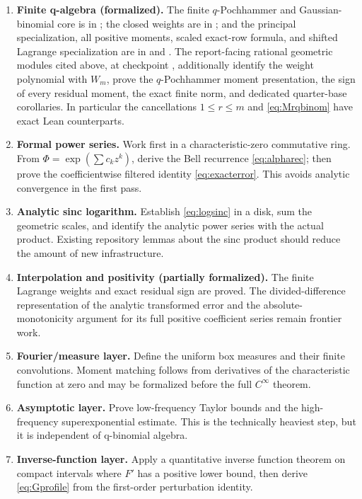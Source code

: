 \documentclass[11pt]{article}
\theoremstyle{definition}
\theoremstyle{remark}
\begin{document}
\begin{enumerate}[label=\arabic*.,leftmargin=9mm]
\item \textbf{Finite q-algebra (formalized).}  The finite \(q\)-Pochhammer
and Gaussian-binomial core is in ; the closed
weights are in ; and the principal
specialization, all positive moments, scaled exact-row formula, and shifted
Lagrange specialization are in  and
.  The report-facing rational geometric
modules cited above, at checkpoint
, additionally identify the
weight polynomial with \(W_m\), prove the \(q\)-Pochhammer moment presentation,
the sign of every residual moment, the exact finite norm, and dedicated
quarter-base corollaries.  In particular the
cancellations \(1\leq r\leq m\) and \eqref{eq:Mrqbinom} have exact Lean
counterparts.

\item \textbf{Formal power series.} Work first in a characteristic-zero
commutative ring. From \(\Phi=\exp(\sum c_kz^k)\), derive the Bell recurrence
\eqref{eq:alpharec}; then prove the coefficientwise filtered identity
\eqref{eq:exacterror}. This avoids analytic convergence in the first pass.

\item \textbf{Analytic sinc logarithm.} Establish \eqref{eq:logsinc} in a disk,
sum the geometric scales, and identify the analytic power series with the actual
product. Existing repository lemmas about the sinc product should reduce the
amount of new infrastructure.

\item \textbf{Interpolation and positivity (partially formalized).}  The
finite Lagrange weights and exact residual sign are proved.  The
divided-difference representation of the analytic transformed error and the
absolute-monotonicity argument for its full positive coefficient series remain
frontier work.

\item \textbf{Fourier/measure layer.} Define the uniform box measures and their
finite convolutions. Moment matching follows from derivatives of the
characteristic function at zero and may be formalized before the full
\(C^\infty\) theorem.

\item \textbf{Asymptotic layer.} Prove low-frequency Taylor bounds and the
high-frequency superexponential estimate. This is the technically heaviest step,
but it is independent of q-binomial algebra.

\item \textbf{Inverse-function layer.} Apply a quantitative inverse function
theorem on compact intervals where \(F'\) has a positive lower bound, then derive
\eqref{eq:Gprofile} from the first-order perturbation identity.
\end{enumerate}
\end{document}
